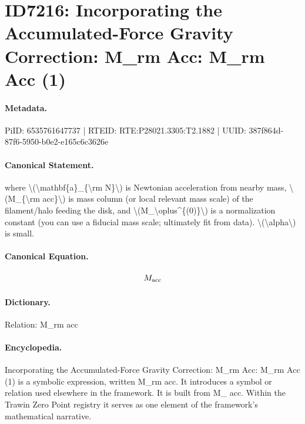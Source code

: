 \section*{ID7216: Incorporating the Accumulated-Force Gravity Correction: M\_rm Acc: M\_rm Acc (1)}
\paragraph{Metadata.}
PiID: 6535761647737 | RTEID: RTE:P28021.3305:T2.1882 | UUID: 387f864d-87f6-5950-b0e2-e165c6c3626e

\paragraph{Canonical Statement.}
where \textbackslash{}(\textbackslash{}mathbf\{a\}\_\{\textbackslash{}rm N\}\textbackslash{}) is Newtonian acceleration from nearby mass, \textbackslash{}(M\_\{\textbackslash{}rm acc\}\textbackslash{}) is mass column (or local relevant mass scale) of the filament/halo feeding the disk, and \textbackslash{}(M\_\textbackslash{}oplus\textasciicircum{}\{(0)\}\textbackslash{}) is a normalization constant (you can use a fiducial mass scale; ultimately fit from data). \textbackslash{}(\textbackslash{}alpha\textbackslash{}) is small.

\paragraph{Canonical Equation.}
\[
M_{\rm acc}
\]

\paragraph{Dictionary.}
Relation: M\_rm acc

\paragraph{Encyclopedia.}
Incorporating the Accumulated-Force Gravity Correction: M\_rm Acc: M\_rm Acc (1) is a symbolic expression, written M\_rm acc. It introduces a symbol or relation used elsewhere in the framework. It is built from M\_ acc. Within the Trawin Zero Point registry it serves as one element of the framework's mathematical narrative.

